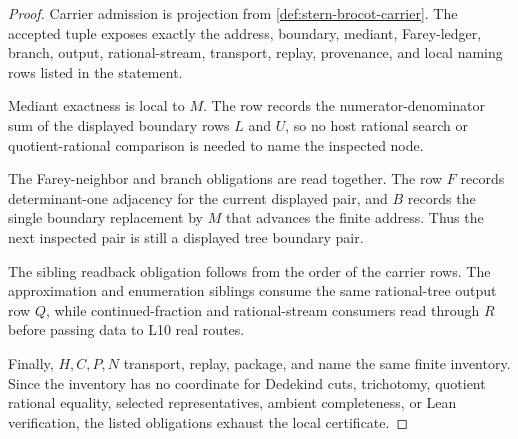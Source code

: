 \begin{proof}
Carrier admission is projection from \autoref{def:stern-brocot-carrier}. The accepted tuple exposes exactly the address, boundary, mediant, Farey-ledger, branch, output, rational-stream, transport, replay, provenance, and local naming rows listed in the statement.

Mediant exactness is local to $M$. The row records the numerator-denominator sum of the displayed boundary rows $L$ and $U$, so no host rational search or quotient-rational comparison is needed to name the inspected node.

The Farey-neighbor and branch obligations are read together. The row $F$ records determinant-one adjacency for the current displayed pair, and $B$ records the single boundary replacement by $M$ that advances the finite address. Thus the next inspected pair is still a displayed tree boundary pair.

The sibling readback obligation follows from the order of the carrier rows. The approximation and enumeration siblings consume the same rational-tree output row $Q$, while continued-fraction and rational-stream consumers read through $R$ before passing data to L10 real routes.

Finally, $H,C,P,N$ transport, replay, package, and name the same finite inventory. Since the inventory has no coordinate for Dedekind cuts, trichotomy, quotient rational equality, selected representatives, ambient completeness, or Lean verification, the listed obligations exhaust the local certificate.
\end{proof}

